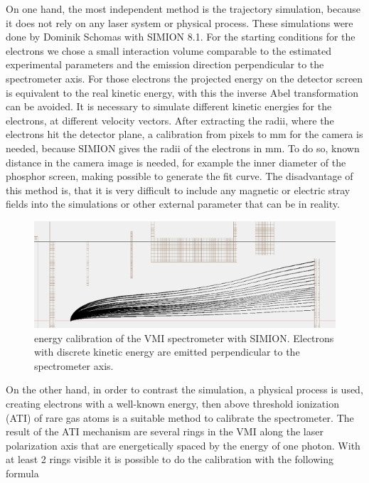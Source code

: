 On one hand, the most independent method is the trajectory simulation, because it does not rely on any laser system or physical process. These simulations were done by Dominik Schomas with SIMION 8.1. For the starting conditions for the electrons we chose a small interaction volume comparable to the estimated experimental parameters and the emission direction perpendicular to the spectrometer axis. For those electrons the projected energy on the detector screen is equivalent to the real kinetic energy, with this the inverse Abel transformation can be avoided. It is necessary to simulate different kinetic energies for the electrons, at different velocity vectors. After extracting the radii, where the electrons hit the detector plane, a calibration from pixels to mm for the camera is needed, because SIMION gives the radii of the electrons in mm. To do so, known distance in the camera image is needed, for example the inner diameter of the phosphor screen, making possible to generate the fit curve. The disadvantage of this method is, that it is very difficult to include any magnetic or electric stray fields into the simulations or other external parameter that can be in reality.

\begin{figure}[h!]
\centering
\includegraphics[scale=1]{../images/simion_calib.png}
\caption{energy calibration of the VMI spectrometer with SIMION. Electrons with discrete kinetic energy are emitted perpendicular to the spectrometer axis.}
\end{figure}


On the other hand, in order to contrast the simulation, a physical process is used, creating electrons with a well-known energy, then above threshold ionization (ATI) of rare gas atoms is a suitable method to calibrate the spectrometer. The result of the ATI mechanism are several rings in the VMI along the laser polarization axis that are energetically spaced by the energy of one photon. With at least 2 rings visible it is possible to do the calibration with the following formula

